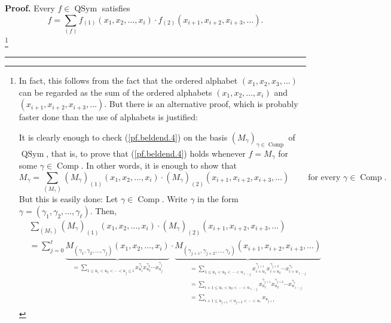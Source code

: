 \documentclass[numbers=enddot,12pt,final,onecolumn,notitlepage,abstracton]{scrartcl}%
\theoremstyle{definition}
\newenvironment{proof}[1][Proof]{\noindent\textbf{#1.} }{\ \rule{0.5em}{0.5em}}
\newenvironment{noncompile}{}{}
\let\sumnonlimits\sum
\renewcommand{\sum}{\sumnonlimits\limits}
\begin{document}
\begin{noncompile}
\begin{proof}
Every $f\in\operatorname*{QSym}$ satisfies%
\begin{equation}
f=\sum_{\left(  f\right)  }f_{\left(  1\right)  }\left(  x_{1},x_{2}%
,\ldots,x_{i}\right)  \cdot f_{\left(  2\right)  }\left(  x_{i+1}%
,x_{i+2},x_{i+3},\ldots\right)  . \label{pf.beldend.4}%
\end{equation}
\footnote{In fact, this follows from the fact that the ordered alphabet
$\left(  x_{1},x_{2},x_{3},\ldots\right)  $ can be regarded as the sum of the
ordered alphabets $\left(  x_{1},x_{2},\ldots,x_{i}\right)  $ and $\left(
x_{i+1},x_{i+2},x_{i+3},\ldots\right)  $. But there is an alternative proof,
which is probably faster done than the use of alphabets is justified:
\par
It is clearly enough to check (\ref{pf.beldend.4}) on the basis $\left(
M_{\gamma}\right)  _{\gamma\in\operatorname*{Comp}}$ of $\operatorname*{QSym}%
$, that is, to prove that (\ref{pf.beldend.4}) holds whenever $f=M_{\gamma}$
for some $\gamma\in\operatorname*{Comp}$. In other words, it is enough to show
that
\[
M_{\gamma}=\sum_{\left(  M_{\gamma}\right)  }\left(  M_{\gamma}\right)
_{\left(  1\right)  }\left(  x_{1},x_{2},\ldots,x_{i}\right)  \cdot\left(
M_{\gamma}\right)  _{\left(  2\right)  }\left(  x_{i+1},x_{i+2},x_{i+3}%
,\ldots\right)  \ \ \ \ \ \ \ \ \ \ \text{for every }\gamma\in
\operatorname*{Comp}.
\]
But this is easily done: Let $\gamma\in\operatorname*{Comp}$. Write $\gamma$
in the form $\gamma=\left(  \gamma_{1},\gamma_{2},\ldots,\gamma_{\ell}\right)
$. Then,%
\begin{align*}
&  \sum_{\left(  M_{\gamma}\right)  }\left(  M_{\gamma}\right)  _{\left(
1\right)  }\left(  x_{1},x_{2},\ldots,x_{i}\right)  \cdot\left(  M_{\gamma
}\right)  _{\left(  2\right)  }\left(  x_{i+1},x_{i+2},x_{i+3},\ldots\right)
\\
&  =\sum_{j=0}^{\ell}\underbrace{M_{\left(  \gamma_{1},\gamma_{2}%
,\ldots,\gamma_{j}\right)  }\left(  x_{1},x_{2},\ldots,x_{i}\right)  }%
_{=\sum_{1\leq u_{1}<u_{2}<\cdots<u_{j}\leq i}x_{u_{1}}^{\gamma_{1}}x_{u_{2}%
}^{\gamma_{2}}\cdots x_{u_{j}}^{\gamma_{j}}}\cdot\underbrace{M_{\left(
\gamma_{j+1},\gamma_{j+2},\ldots,\gamma_{\ell}\right)  }\left(  x_{i+1}%
,x_{i+2},x_{i+3},\ldots\right)  }_{\substack{=\sum_{1\leq u_{1}<u_{2}%
<\cdots<u_{\ell-j}}x_{i+u_{1}}^{\gamma_{j+1}}x_{i+u_{2}}^{\gamma_{j+2}}\cdots
x_{i+u_{\ell-j}}^{\gamma_{\ell}}\\=\sum_{i+1\leq u_{1}<u_{2}<\cdots<u_{\ell
-j}}x_{u_{1}}^{\gamma_{j+1}}x_{u_{2}}^{\gamma_{j+2}}\cdots x_{u_{\ell-j}%
}^{\gamma_{\ell}}\\=\sum_{i+1\leq u_{j+1}<u_{j+2}<\cdots<u_{\ell}}x_{u_{j+1}%
}}}
\end{align*}}
\end{proof}
\end{noncompile}
\end{document}
